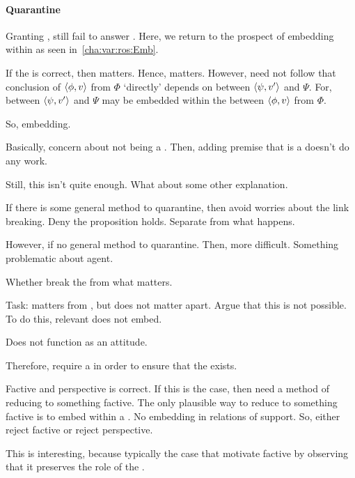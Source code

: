 \paragraph{Quarantine}

\begin{note}
  Granting \agpe{}, still fail to answer \qWhyVnP{}.
  Here, we return to the prospect of embedding  within  as seen in~\autoref{cha:var:ros:Emb}.

  If the \agpe{} is correct, then \fc{} matters.
  Hence, \ros{} matters.
  However, need not follow that conclusion of \(\langle \phi, v \rangle\) from \(\Phi\) `directly' depends on \ros{} between \(\langle \psi, v' \rangle\) and \(\Psi\).
  For, \ros{} between \(\langle \psi, v' \rangle\) and \(\Psi\) may be embedded within the \ros{} between \(\langle \phi, v \rangle\) from \(\Phi\).
\end{note}

\begin{note}
  So, embedding.

  Basically, concern about not being a \fc{}.
  Then, adding premise that is a \fc{} doesn't do any work.
\end{note}

\begin{note}
  Still, this isn't quite enough.
  What about some other explanation.

  If there is some general method to quarantine, then avoid worries about the link breaking.
  Deny the proposition holds.
  Separate \agpe{} from what happens.

  However, if no general method to quarantine.
  Then, more difficult.
  Something problematic about agent.

  Whether break the \agpe{} from what matters.

  Task: \fc{} matters from \agpe{}, but does not matter apart.
  Argue that this is not possible.
  To do this, relevant \fc{} does not embed.

  Does not function as an attitude.
\end{note}

\begin{note}
  Therefore, require a \wit{} in order to ensure that the \ros{} exists.
\end{note}

\begin{note}
  Factive and perspective is correct.
  If this is the case, then need a method of reducing to something factive.
  The only plausible way to reduce to something factive is to embed within a \ros{}.
  No embedding in relations of support.
  So, either reject factive or reject perspective.

  This is interesting, because typically the case that motivate factive by observing that it preserves the role of the \agpe{}.
\end{note}

